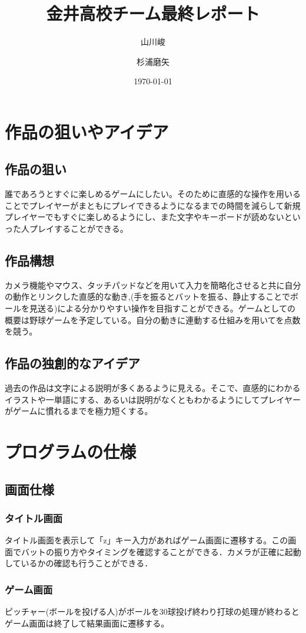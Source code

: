 \documentclass{jsarticle}
\title{金井高校チーム最終レポート}
\author{山川峻 \and 杉浦磨矢}
\date{\today}
\begin{document}
\maketitle
\section{作品の狙いやアイデア}
\subsection{作品の狙い}
誰であろうとすぐに楽しめるゲームにしたい。そのために直感的な操作を用いることでプレイヤーがまともにプレイできるようになるまでの時間を減らして新規プレイヤーでもすぐに楽しめるようにし、また文字やキーボードが読めないといった人プレイすることができる。
 \subsection{作品構想}
カメラ機能やマウス、タッチパッドなどを用いて入力を簡略化させると共に自分の動作とリンクした直感的な動き,(手を振るとバットを振る、静止することでボールを見送る)による分かりやすい操作を目指すことができる。ゲームとしての概要は野球ゲームを予定している。自分の動きに連動する仕組みを用いてを点数を競う。
 \subsection{作品の独創的なアイデア}
過去の作品は文字による説明が多くあるように見える。そこで、直感的にわかるイラストや一単語にする、あるいは説明がなくともわかるようにしてプレイヤーがゲームに慣れるまでを極力短くする。
\section{プログラムの仕様}
\subsection{画面仕様}
\subsubsection{タイトル画面}
タイトル画面を表示して「z」キー入力があればゲーム画面に遷移する。この画面でバットの振り方やタイミングを確認することができる．カメラが正確に起動しているかの確認も行うことができる．
\subsubsection{ゲーム画面}
ピッチャー(ボールを投げる人)がボールを30球投げ終わり打球の処理が終わるとゲーム画面は終了して結果画面に遷移する。
\end{document}
